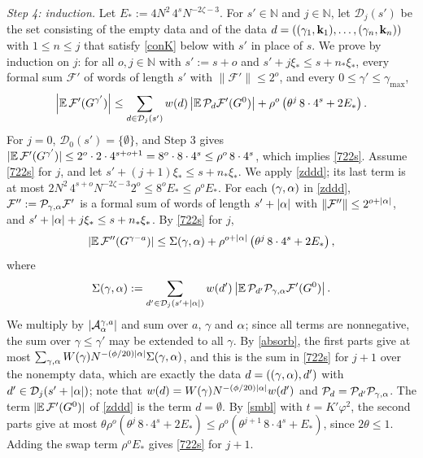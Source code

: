 {\it Step 4: induction.} Let $E_*:=4N^2\,4^sN^{-2\zeta-3}$. For $s'\in\mathbb N$ and $j\in\mathbb N$, let $\mathcal D_j(s')$ be the set consisting of the empty data and of the data $d=((\gamma_1,{\bf k}_1),\dots,(\gamma_n,{\bf k}_n))$ with $1\le n\le j$ that satisfy \eqref{conK} below with $s'$ in place of $s$. We prove by induction on $j$: for all $o,j\in\mathbb N$ with $s':=s+o$ and $s'+j\xi_*\le s+n_*\xi_*$, every formal sum $\mathcal F'$ of words of length $s'$ with $\|\mathcal F'\|\le2^o$, and every $0\le\gamma'\le\gamma_{\max}$,
\begin{equation} \label{722s}
\left|\mathbb{E}\,\mathcal F'(G^{\gamma'})\right|\le\sum_{d\in\mathcal D_j(s')}w(d)\left|\mathbb{E}\,\mathcal P_d\mathcal F'(G^0)\right|+\rho^o\left(\theta^j\,8\cdot4^s+2E_*\right).
\end{equation}
For $j=0$, $\mathcal D_0(s')=\{\emptyset\}$, and Step 3 gives $|\mathbb{E}\,\mathcal F'(G^{\gamma'})|\le2^o\cdot2\cdot4^{s+o+1}=8^o\cdot8\cdot4^s\le\rho^o\,8\cdot4^s$, which implies \eqref{722s}. Assume \eqref{722s} for $j$, and let $s'+(j+1)\xi_*\le s+n_*\xi_*$. We apply \eqref{zddd}; its last term is at most $2N^2\,4^{s+o}N^{-2\zeta-3}2^o\le8^oE_*\le\rho^oE_*$. For each $(\gamma,\alpha)$ in \eqref{zddd}, $\mathcal F'':=\mathcal P_{\gamma,\alpha}\mathcal F'$ is a formal sum of words of length $s'+|\alpha|$ with $\|\mathcal F''\|\le2^{o+|\alpha|}$, and $s'+|\alpha|+j\xi_*\le s+n_*\xi_*$. By \eqref{722s} for $j$,
$$
|\mathbb{E}\,\mathcal F''(G^{\gamma-a})|\le\Sigma(\gamma,\alpha)+\rho^{o+|\alpha|}\left(\theta^j\,8\cdot4^s+2E_*\right),
$$
where
$$
\Sigma(\gamma,\alpha):=\sum_{d'\in\mathcal D_j(s'+|\alpha|)}w(d')\left|\mathbb{E}\,\mathcal P_{d'}\mathcal P_{\gamma,\alpha}\mathcal F'(G^0)\right|.
$$
We multiply by $|\mathcal A^{\gamma,a}_\alpha|$ and sum over $a$, $\gamma$ and $\alpha$; since all terms are nonnegative, the sum over $\gamma\le\gamma'$ may be extended to all $\gamma$. By \eqref{absorb}, the first parts give at most $\sum_{\gamma,\alpha}W(\gamma)N^{-(\phi/20)|\alpha|}\Sigma(\gamma,\alpha)$, and this is the sum in \eqref{722s} for $j+1$ over the nonempty data, which are exactly the data $d=((\gamma,\alpha),d')$ with $d'\in\mathcal D_j(s'+|\alpha|)$; note that $w(d)=W(\gamma)N^{-(\phi/20)|\alpha|}w(d')$ and $\mathcal P_d=\mathcal P_{d'}\mathcal P_{\gamma,\alpha}$. The term $|\mathbb{E}\,\mathcal F'(G^0)|$ of \eqref{zddd} is the term $d=\emptyset$. By \eqref{smbl} with $t=K'\varphi^2$, the second parts give at most $\theta\rho^o(\theta^j\,8\cdot4^s+2E_*)\le\rho^o(\theta^{j+1}\,8\cdot4^s+E_*)$, since $2\theta\le1$. Adding the swap term $\rho^oE_*$ gives \eqref{722s} for $j+1$.

